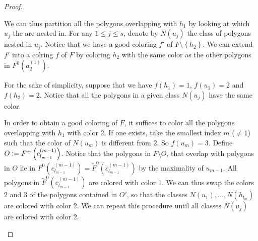 \documentclass[12pt]{article}
\theoremstyle{definition}
\newcommand{\defeq}{\vcentcolon=}
\begin{document}
\begin{proof}
\begin{itemize}
\begin{figure}[ht]
\begin{center}
{\begin{tikzpicture}[line width=0.7pt, line cap=round]
             \end{tikzpicture}
             }
             \end{center}
             \caption{}
             \label{figure:multi}
             \end{figure} 

             We can thus partition all the
             polygons overlapping with
             $h_1$ by looking at which $u_{j}$ 
             the are nested in. For any
             $1 \leq j \leq s$, denote
             by $N\left(u_{j}\right)$
             the class of polygons 
             nested in $u_{j}$.
             Notice that we have a good coloring
             $f'$ of $F \setminus \left\{h_2\right\}$.
             We can extend $f'$ into a colring
             $f$ of $F$ by coloring $h_2$ with
             the same color as the other polygons in
             $F^{0}\left(a_2^{\left(1\right)}\right)$.

             For the sake of simplicity,
             suppose that we have
             $f\left(h_1\right) = 1$,
             $f\left(u_1\right) = 2$ and
             $f\left(h_2\right) = 2$.
             Notice that all the polygons
             in a given class $N\left(u_{j}\right)$ 
             have the same color.

             In order to obtain a good coloring
             of $F$, it suffices to color all the polygons
             overlapping with $h_1$ with color 2.
             If one exists, take the smallest index
             $m$ ($\neq 1$) such that 
             the color of $N\left(u_{m}\right)$ 
             is different from 2. So $f\left(u_{m}\right) = 3$.
             Define $O \defeq F^{+}\left(c_{l_{m-1}}^{\left(m-1\right)}\right)$.
             Notice that the polygons 
             in $F \setminus O$, that overlap
             with polygons in $O$ lie in
             $F^{0}\left(c_{l_{m-1}}^{\left(m-1\right)}\right) =
             \widetilde{F}^{0}\left(c_{l_{m-1}}^{\left(m -1\right)}\right)$
             by the maximality of $u_{m-1}$.
             All polygons in
             $\widetilde{F}^{0}\left(c_{l_{m-1}}^{\left(m -1\right)}\right)$
             are colored
             with color 1.
             We can thus swap the colors
             2 and 3 of the polygons 
             contained in $O'$, so that
             the classes $N\left(u_1\right),
             \ldots, N\left(h_{l_{m}}\right)$ are
             colored with color 2.
             We can repeat this procedure until
             all classes $N\left(u_{j}\right)$ 
             are colored with color 2.
             

\end{itemize}
\end{proof}
\end{document}
